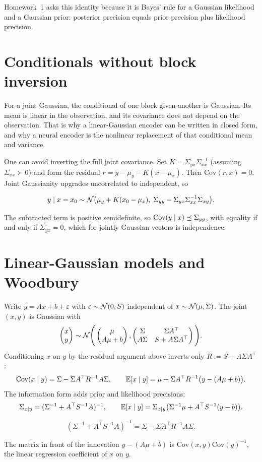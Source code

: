 Homework~1 asks this identity because it is Bayes' rule for a Gaussian likelihood and a Gaussian prior: posterior precision equals prior precision plus likelihood precision.

\section{Conditionals without block inversion}

For a joint Gaussian, the conditional of one block given another is Gaussian. Its mean is linear in the observation, and its covariance does not depend on the observation. That is why a linear-Gaussian encoder can be written in closed form, and why a neural encoder is the nonlinear replacement of that conditional mean and variance.

One can avoid inverting the full joint covariance. Set $K=\Sigma_{yx}\Sigma_{xx}^{-1}$ (assuming $\Sigma_{xx}\succ 0$) and form the residual $r=y-\mu_y-K(x-\mu_x)$. Then $\mathrm{Cov}(r,x)=0$. Joint Gaussianity upgrades uncorrelated to independent, so
\begin{resultbox}
\[
y\mid x=x_0\sim\mathcal{N}\bigl(\mu_y+K(x_0-\mu_x),\;\Sigma_{yy}-\Sigma_{yx}\Sigma_{xx}^{-1}\Sigma_{xy}\bigr).
\]
\end{resultbox}
The subtracted term is positive semidefinite, so $\mathrm{Cov}(y\mid x)\preceq\Sigma_{yy}$, with equality if and only if $\Sigma_{yx}=0$, which for jointly Gaussian vectors is independence.

\section{Linear-Gaussian models and Woodbury}

Write $y=Ax+b+\varepsilon$ with $\varepsilon\sim\mathcal{N}(0,S)$ independent of $x\sim\mathcal{N}(\mu,\Sigma)$. The joint $(x,y)$ is Gaussian with
\[
\begin{pmatrix}x\\ y\end{pmatrix}
\sim\mathcal{N}\Bigg(
\begin{pmatrix}\mu\\ A\mu+b\end{pmatrix},
\begin{pmatrix}\Sigma & \Sigma A^\top\\ A\Sigma & S+A\Sigma A^\top\end{pmatrix}
\Bigg).
\]
Conditioning $x$ on $y$ by the residual argument above inverts only $R:=S+A\Sigma A^\top$:
\[
\mathrm{Cov}(x\mid y)=\Sigma-\Sigma A^\top R^{-1}A\Sigma,\qquad
\mathbb{E}[x\mid y]=\mu+\Sigma A^\top R^{-1}\bigl(y-(A\mu+b)\bigr).
\]
The information form adds prior and likelihood precisions:
\[
\Sigma_{x\mid y}=(\Sigma^{-1}+A^\top S^{-1}A)^{-1},\qquad
\mathbb{E}[x\mid y]=\Sigma_{x\mid y}\bigl(\Sigma^{-1}\mu+A^\top S^{-1}(y-b)\bigr).
\]
\begin{resultbox}
\[
(\Sigma^{-1}+A^\top S^{-1}A)^{-1}=\Sigma-\Sigma A^\top R^{-1}A\Sigma.
\]
\end{resultbox}
The matrix in front of the innovation $y-(A\mu+b)$ is $\mathrm{Cov}(x,y)\mathrm{Cov}(y)^{-1}$, the linear regression coefficient of $x$ on $y$.

